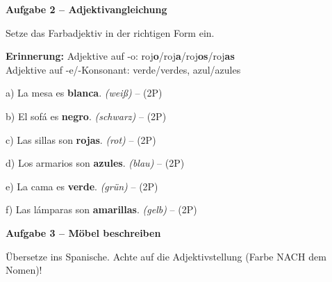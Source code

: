 \documentclass[11pt, a4paper]{article}
\newcommand{\fachfarbe}{spanisch}
\newcommand{\punktebox}[1]{\hfill\fbox{\small \_/#1}}
\newcommand{\lsg}[1]{\textcolor{loesung}{\textbf{#1}}}
\newenvironment{aufgabe}[1]{%
    \needspace{5\baselineskip}%
    \nopagebreak[4]%
    \vspace{10pt}
    \noindent\textbf{\textcolor{\fachfarbe}{Aufgabe #1}}
    \nopagebreak[4]%
    \vspace{5pt}
    \nopagebreak[4]%
    \begin{list}{}{\leftmargin=0pt}
    \item[]
}{%
    \end{list}
}
\begin{document}
\vspace{15pt}


\begin{aufgabe}{2 -- Adjektivangleichung}
Setze das Farbadjektiv in der richtigen Form ein. \punktebox{12}
\end{aufgabe}

\begin{regelbox}
\textbf{Erinnerung:} Adjektive auf -o: roj\textbf{o}/roj\textbf{a}/roj\textbf{os}/roj\textbf{as} \\
Adjektive auf -e/-Konsonant: verde/verdes, azul/azules
\end{regelbox}

\vspace{0.8em}

\noindent
a) La mesa es \lsg{blanca}. \hfill \textit{(weiß)} -- (2P)

\vspace{0.8em}

\noindent
b) El sofá es \lsg{negro}. \hfill \textit{(schwarz)} -- (2P)

\vspace{0.8em}

\noindent
c) Las sillas son \lsg{rojas}. \hfill \textit{(rot)} -- (2P)

\vspace{0.8em}

\noindent
d) Los armarios son \lsg{azules}. \hfill \textit{(blau)} -- (2P)

\vspace{0.8em}

\noindent
e) La cama es \lsg{verde}. \hfill \textit{(grün)} -- (2P)

\vspace{0.8em}

\noindent
f) Las lámparas son \lsg{amarillas}. \hfill \textit{(gelb)} -- (2P)

\vspace{15pt}


\begin{aufgabe}{3 -- Möbel beschreiben}
Übersetze ins Spanische. Achte auf die Adjektivstellung (Farbe NACH dem Nomen)! \punktebox{8}
\end{aufgabe}
\end{document}
